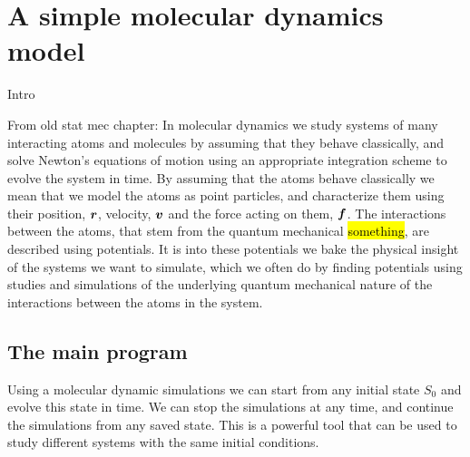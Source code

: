 \chapter{A simple molecular dynamics model\label{chap:simple_md_program}}
Intro

From old stat mec chapter:
In molecular dynamics we study systems of many interacting atoms and molecules by assuming that they behave classically, and solve Newton's equations of motion using an appropriate integration scheme to evolve the system in time. By assuming that the atoms behave classically we mean that we model the atoms as point particles, and characterize them using their position, $\boldsymbol{r}$, velocity, $\boldsymbol{v}$ and the force acting on them, $\boldsymbol{f}$. The interactions between the atoms, that stem from the quantum mechanical \hl{something}, are described using potentials. It is into these potentials we bake the physical insight of the systems we want to simulate, which we often do by finding potentials using studies and simulations of the underlying quantum mechanical nature of the interactions between the atoms in the system.

\section{The main program}
%
Using a molecular dynamic simulations we can start from any initial state $S_0$ and evolve this state in time. We can stop the simulations at any time, and continue the simulations from any saved state. This is a powerful tool that can be used to study different systems with the same initial conditions. 

